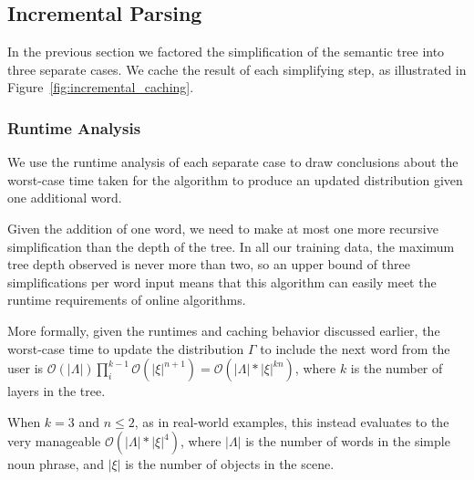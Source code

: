 \documentclass[conference]{IEEEtran}
\numberwithin{equation}{section}
\begin{document}
\subsection{Incremental Parsing}

In the previous section we factored the simplification of the semantic tree into three separate cases. We cache the result of each simplifying step, as illustrated in Figure~\ref{fig:incremental_caching}.


\subsubsection{Runtime Analysis}

We use the runtime analysis of each separate case to draw conclusions about the worst-case time taken for the algorithm to produce an updated distribution given one additional word.

Given the addition of one word, we need to make at most one more recursive simplification than the depth of the tree. In all our training data, the maximum tree depth observed is never more than two, so an upper bound of three simplifications per word input means that this algorithm can easily meet the runtime requirements of online algorithms.

More formally, given the runtimes and caching behavior discussed earlier, the worst-case time to update the distribution $\Gamma$ to include the next word from the user is $\mathcal{O}(|\Lambda|) \prod_i^{k-1} \mathcal{O}(|\xi|^{n+1}) = \mathcal{O}(|\Lambda| * |\xi|^{kn})$, where $k$ is the number of layers in the tree.

When $k = 3$ and $n \leq 2$, as in real-world examples, this instead evaluates to the very manageable $\mathcal{O}(|\Lambda| * |\xi|^{4})$, where $|\Lambda|$ is the number of words in the simple noun phrase, and $|\xi|$ is the number of objects in the scene.
\end{document}
